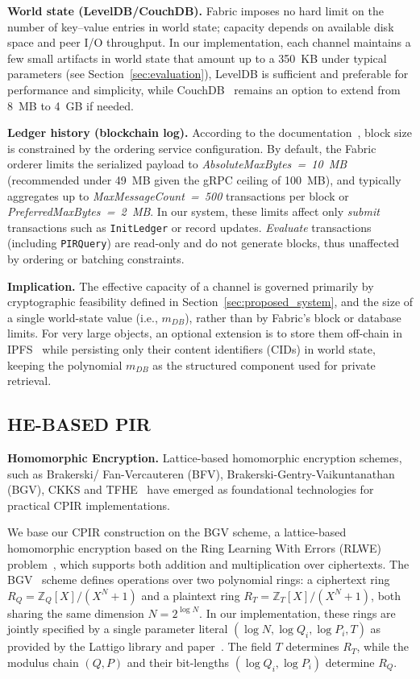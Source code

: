 \documentclass{ieeetj}
\begin{document}
\textbf{World state (LevelDB/CouchDB).}
Fabric imposes no hard limit on the number of key–value entries in world state; capacity depends on available disk space and peer I/O throughput.
In our implementation, each channel maintains a few small artifacts in world state that amount up to a 350~KB under typical parameters (see Section~\ref{sec:evaluation}), 
LevelDB is sufficient and preferable for performance and simplicity, while CouchDB~\cite{fabric_docs_a_nodate} remains an option to extend from 8~MB to 4~GB if needed.

\textbf{Ledger history (blockchain log).}
According to the documentation~\cite{fabric_docs_a_nodate}, block size is constrained by the ordering service configuration. 
By default, the Fabric orderer limits the serialized payload to \emph{AbsoluteMaxBytes~=~10~MB} (recommended under 49~MB given the gRPC ceiling of 100~MB), 
and typically aggregates up to \emph{MaxMessageCount~=~500} transactions per block or \emph{PreferredMaxBytes~=~2~MB}.
In our system, these limits affect only \emph{submit} transactions such as \texttt{InitLedger} or record updates. 
\emph{Evaluate} transactions (including \texttt{PIRQuery}) are read-only and do not generate blocks, thus unaffected by ordering or batching constraints.

\textbf{Implication.}
The effective capacity of a channel is governed primarily by cryptographic feasibility defined in Section~\ref{sec:proposed_system},
and the size of a single world-state value (i.e., \emph{$m_{DB}$}), rather than by Fabric’s block or database limits. 
For very large objects, an optional extension is to store them off-chain 
in IPFS~\cite{benet_ipfs_2014} while persisting only their content identifiers (CIDs) in world state, 
keeping the polynomial \emph{$m_{DB}$} as the structured component used for private retrieval.

\subsection{HE-BASED PIR}
\textbf{Homomorphic Encryption.}
Lattice-based homomorphic encryption schemes, such as Brakerski/ Fan-Vercauteren (BFV), Brakerski-Gentry-Vaikuntanathan 
(BGV), CKKS and TFHE~\cite{cryptoeprint:2012/144,cryptoeprint:2011/277,cheon_homomorphic_2017,cryptoeprint:2018/421} have emerged as 
foundational technologies for practical CPIR implementations.

We base our CPIR construction on the BGV scheme, a lattice-based homomorphic encryption based on 
the Ring Learning With Errors (RLWE) problem~\cite{peikert_lattice_2014}, which supports both addition and multiplication over ciphertexts.
The BGV~\cite{cryptoeprint:2011/277} scheme defines operations over two polynomial rings: 
a ciphertext ring $R_Q = \mathbb{Z}_Q[X]/(X^N+1)$ and a plaintext ring $R_T = \mathbb{Z}_T[X]/(X^N+1)$, 
both sharing the same dimension $N=2^{\log N}$. 
In our implementation, these rings are jointly specified by a single parameter literal 
$(\log N, \log Q_i, \log P_i, T)$ as provided by the Lattigo library \cite{noauthor_lattigo_2024} and paper~\cite{mouchet_multiparty_2020}.
The field $T$ determines $R_T$, while the modulus chain $(Q,P)$ and their bit-lengths $(\log Q_i, \log P_i)$ 
determine $R_Q$.
\end{document}
